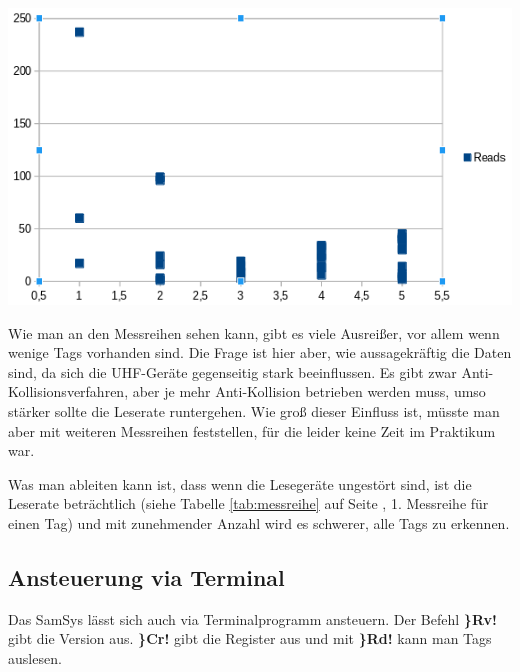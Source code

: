 \documentclass[paper=a4,fontsize=11pt,headsepline,footsepline,parskip=half]{scrartcl}
\begin{document}
\begin{center}
 \includegraphics[width=0.7\linewidth]{messreihe}
\end{center}

Wie man an den Messreihen sehen kann, gibt es viele Ausreißer, vor allem wenn wenige Tags vorhanden sind. Die Frage ist hier aber, wie aussagekräftig
die Daten sind, da sich die UHF-Geräte gegenseitig stark beeinflussen. Es gibt zwar Anti-Kollisionsverfahren, aber je mehr Anti-Kollision betrieben
werden muss, umso stärker sollte die Leserate runtergehen. Wie groß dieser Einfluss ist, müsste man aber mit weiteren Messreihen feststellen, für
die leider keine Zeit im Praktikum war.

Was man ableiten kann ist, dass wenn die Lesegeräte ungestört sind, ist die Leserate beträchtlich (siehe Tabelle \ref{tab:messreihe} auf Seite
\pageref{tab:messreihe}, 1. Messreihe für einen Tag) und mit zunehmender Anzahl wird es schwerer, alle Tags zu erkennen.

\subsection{Ansteuerung via Terminal}

Das SamSys lässt sich auch via Terminalprogramm ansteuern. Der Befehl \textbf{\}Rv!} gibt die Version aus. \textbf{\}Cr!} gibt die Register aus und
mit \textbf{\}Rd!} kann man Tags auslesen.
\end{document}
